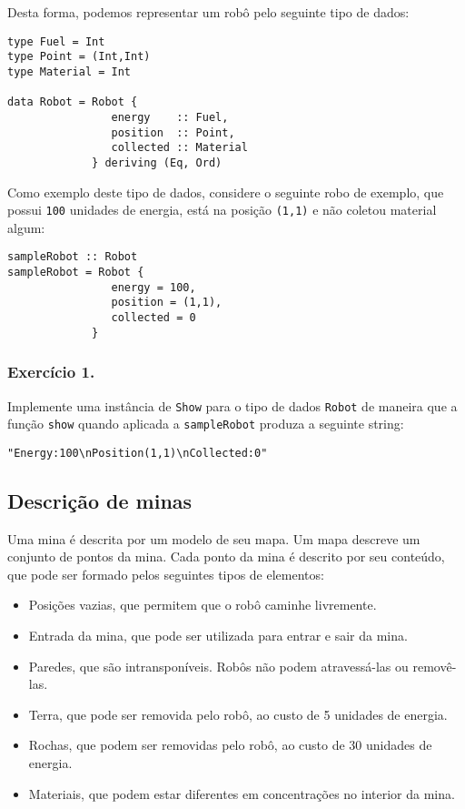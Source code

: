 \documentclass[a4paper]{article}
\begin{document}
Desta forma, podemos representar um robô pelo seguinte tipo de dados:

\begin{verbatim}
type Fuel = Int
type Point = (Int,Int)
type Material = Int

data Robot = Robot {
                energy    :: Fuel,
                position  :: Point,
                collected :: Material
             } deriving (Eq, Ord)
\end{verbatim}

Como exemplo deste tipo de dados, considere o seguinte robo de exemplo, que possui
\texttt{100} unidades de energia, está na posição \texttt{(1,1)} e não coletou material algum:

\begin{verbatim}
sampleRobot :: Robot
sampleRobot = Robot {
                energy = 100,
                position = (1,1),
                collected = 0
             }
\end{verbatim}

\subsubsection{Exercício 1.}
\label{sec:org6c3dcc9}

Implemente uma instância de \texttt{Show} para o tipo de
dados \texttt{Robot} de maneira que a função \texttt{show} quando
aplicada a \texttt{sampleRobot} produza a seguinte string:

\texttt{"Energy:100\textbackslash{}nPosition(1,1)\textbackslash{}nCollected:0"}


\subsection{Descrição de minas}
\label{sec:org410a7e2}

Uma mina é descrita por um modelo de seu mapa. Um mapa descreve um conjunto de pontos
da mina. Cada ponto da mina é descrito por seu conteúdo, que pode ser formado pelos
seguintes tipos de elementos:
\begin{itemize}
\item Posições vazias, que permitem que o robô caminhe livremente.
\item Entrada da mina, que pode ser utilizada para entrar e sair da mina.
\item Paredes, que são intransponíveis. Robôs não podem atravessá-las ou removê-las.
\item Terra, que pode ser removida pelo robô, ao custo de 5 unidades de energia.
\item Rochas, que podem ser removidas pelo robô, ao custo de 30 unidades de energia.
\item Materiais, que podem estar diferentes em concentrações no interior da mina.
\end{itemize}
\end{document}
